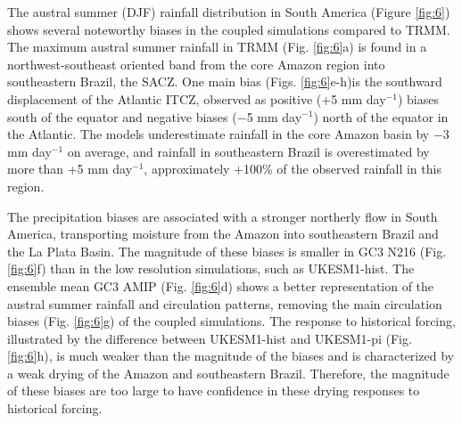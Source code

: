   The austral summer (DJF) rainfall distribution in South America (Figure \ref{fig:6}) shows several noteworthy biases in the coupled simulations compared to TRMM. 
The maximum austral summer rainfall in TRMM
(Fig. \ref{fig:6}a) is found in a northwest-southeast oriented band from the core Amazon region into southeastern Brazil, the SACZ.
One main bias (Figs. \ref{fig:6}e-h)is the southward displacement of the Atlantic ITCZ, observed as positive (+5 mm day$^{-1}$) biases south of the equator and negative biases ($-$5 mm day$^{-1}$) north of the equator in the Atlantic. The models underestimate rainfall in the core Amazon basin by $-$3 mm day$^{-1}$ on average, and rainfall in southeastern Brazil is overestimated by more than +5 mm day$^{-1}$, approximately +100\% of the observed rainfall in this region.  
 
 


 The precipitation biases are associated with a stronger northerly flow in South America, transporting moisture from the Amazon into southeastern Brazil and the La Plata Basin.   
The magnitude of these biases is smaller in GC3 N216 (Fig. \ref{fig:6}f) than in the low resolution simulations, such as UKESM1-hist.   The ensemble mean GC3 AMIP (Fig. \ref{fig:6}d) shows a better representation of the austral summer rainfall and circulation patterns, removing the main circulation biases (Fig. \ref{fig:6}g) of the coupled simulations.   
The response to historical forcing, illustrated by the difference between UKESM1-hist and UKESM1-pi (Fig. \ref{fig:6}h), is much weaker than the magnitude of the biases and is characterized by a weak drying of the Amazon and southeastern Brazil. Therefore, the magnitude of these biases are too large to have confidence in these drying responses to historical forcing. 


